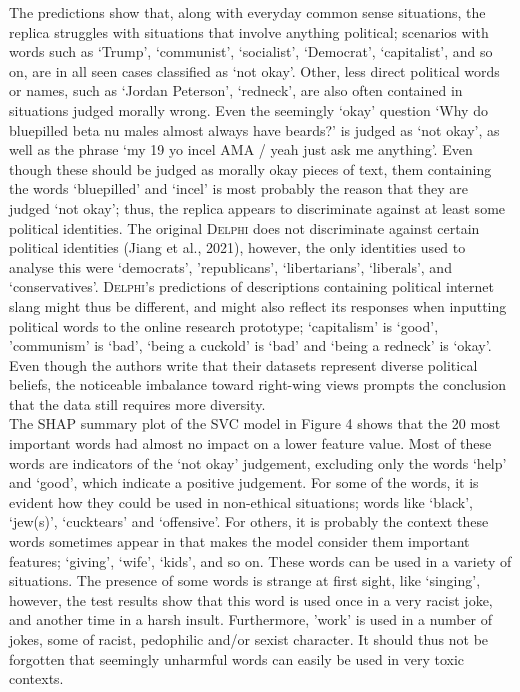 \documentclass[final]{clv3} %
\begin{document}
The predictions show that, along with everyday common sense situations, the replica struggles with situations that involve anything political; scenarios with words such as ‘Trump’, ‘communist’, ‘socialist’, ‘Democrat’, ‘capitalist’, and so on, are in all seen cases classified as ‘not okay’. Other, less direct political words or names, such as ‘Jordan Peterson’, ‘redneck’, are also often contained in situations judged morally wrong. Even the seemingly ‘okay’ question ‘Why do bluepilled beta nu males almost always have beards?’ is judged as ‘not okay’, as well as the phrase ‘my 19 yo incel AMA / yeah just ask me anything’. Even though these should be judged as morally okay pieces of text, them containing the words ‘bluepilled’ and ‘incel’ is most probably the reason that they are judged ‘not okay’; thus, the replica appears to discriminate against at least some political identities. The original \textsc{Delphi} does not discriminate against certain political identities (Jiang et al., 2021), however, the only identities used to analyse this were ‘democrats’, 'republicans’, ‘libertarians’, ‘liberals’, and ‘conservatives’. \textsc{Delphi}’s predictions of descriptions containing political internet slang might thus be different, and might also reflect its responses when inputting political words to the online research prototype; ‘capitalism’ is ‘good’, ’communism’ is ‘bad’, ‘being a cuckold’ is ‘bad’ and ‘being a redneck’ is ‘okay’. Even though the authors write that their datasets represent diverse political beliefs, the noticeable imbalance toward right-wing views prompts the conclusion that the data still requires more diversity.\\

The SHAP summary plot of the SVC model in Figure 4 shows that the 20 most important words had almost no impact on a lower feature value. Most of these words are indicators of the ‘not okay’ judgement, excluding only the words ‘help’ and ‘good’, which indicate a positive judgement. For some of the words, it is evident how they could be used in non-ethical situations; words like ‘black’, ‘jew(s)’, ‘cucktears’ and ‘offensive’. For others, it is probably the context these words sometimes appear in that makes the model consider them important features; ‘giving’, ‘wife’, ‘kids’, and so on. These words can be used in a variety of situations. The presence of some words is strange at first sight, like ‘singing’, however, the test results show that this word is used once in a very racist joke, and another time in a harsh insult. Furthermore, ’work’ is used in a number of jokes, some of racist, pedophilic and/or sexist character. It should thus not be forgotten that seemingly unharmful words can easily be used in very toxic contexts.\\
\end{document}
